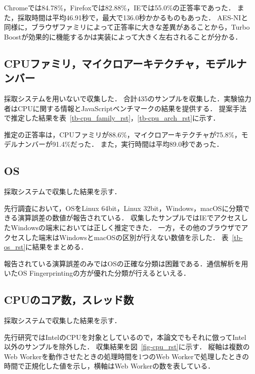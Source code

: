 Chromeでは84.78\%，Firefoxでは82.88\%，IEでは55.0\%の正答率であった．
また，採取時間は平均46.91秒で，最大で136.0秒かかるものもあった．
AES-NIと同様に，ブラウザファミリによって正答率に大きな差異があることから，Turbo Boostが効果的に機能するかは実装によって大きく左右されることが分かる．

\subsection{CPUファミリ，マイクロアーキテクチャ，モデルナンバー}
採取システムを用いないで収集した．
合計435のサンプルを収集した．実験協力者はCPUに関する情報とJavaScriptベンチマークの結果を提供する．
提案手法で推定した結果を表~\ref{tb-cpu_family_rst}，\ref{tb-cpu_arch_rst}に示す．





推定の正答率は，CPUファミリが88.6\%，マイクロアーキテクチャが75.8\%，モデルナンバーが91.4\%だった．
また，実行時間は平均89.0秒であった．

\subsection{OS}
採取システムで収集した結果を示す．

先行調査\cite{tor_mathtan}において，OSをLinux 64bit，Linux 32bit，Windows，macOSに分類できる演算誤差の数値が報告されている．
収集したサンプルではIEでアクセスしたWindowsの端末においては正しく推定できた．
一方，その他のブラウザでアクセスした端末はWindowsとmacOSの区別が行えない数値を示した．
表~\ref{tb-os_rst}に結果をまとめる．



報告されている演算誤差のみではOSの正確な分類は困難である．通信解析を用いたOS Fingerprintingの方が優れた分類が行えるといえる．

\subsection{CPUのコア数，スレッド数}
採取システムで収集した結果を示す．

先行研究\cite{後藤浩行2013web,桐生直輝2014web}ではIntelのCPUを対象としているので，本論文でもそれに倣ってIntel以外のサンプルを除外した．
収集結果を図~\ref{fig-cpu_rst}に示す．
縦軸は複数のWeb Workerを動作させたときの処理時間を1つのWeb Workerで処理したときの時間で正規化した値を示し，横軸はWeb Workerの数を表している．


